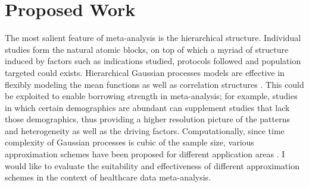 \documentclass[8pt]{article}
\begin{document}
\section{Proposed Work}
The most salient feature of meta-analysis is the hierarchical
structure. Individual studies form the natural atomic blocks, on top of which a
myriad of structure induced by factors such as indications studied, protocols
followed and population targeted could exists. Hierarchical Gaussian processes
models are effective in flexibly modeling the mean functions as well as
correlation structures \citep{ikemoto2009generalizing, williams2009multi}. This
could be exploited to enable borrowing strength in meta-analysis; for example,
studies in which certain demographics are abundant can supplement studies that
lack those demographics, thus providing a higher resolution picture of the
patterns and heterogeneity as well as the driving factors. Computationally,
since time complexity of Gaussian processes is cubic of the sample size, various
approximation schemes have been proposed for different application areas
\citep{archambeau2007gaussian, banerjee2008gaussian}. I would like to evaluate
the suitability and effectiveness of different approximation schemes in the
context of healthcare data meta-analysis.


\small{}
\end{document}
